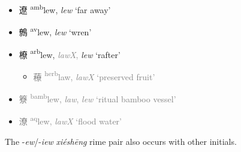 \begin{itemize}
    \item {\Large{遼}} %
    {\large{{\textsuperscript{amb}}lew}},
    \textit{lew} `far away'                  %

    \item {\Large{鷯}} %
    {\large{{\textsuperscript{av}}lew}},
    \textit{lew} `wren'                      %

    \item {\Large{橑}} %
    {\large{{\textsuperscript{arb}}lew}},
    \textcolor{gray}{\textit{lawX},}
    \textit{lew} `rafter'        %

\begin{itemize}
    \item \textcolor{gray}{{\Large{䕩}} %
    {\large{{\textsuperscript{herb}}law}},
    \textit{lawX} `preserved fruit'} %
\end{itemize}

\item \textcolor{gray}{{\Large{簝}} %
{\large{{\textsuperscript{bamb}}lew}},
\textit{law}, \textit{lew} `ritual bamboo vessel'} %

\item \textcolor{gray}{{\Large{潦}} %
{\large{{\textsuperscript{aq}}lew}},
\textit{lawX} `flood water'} %

\end{itemize}

The -\textit{ew}/-\textit{iew} \textit{xiéshēng} rime pair also occurs with other initials.  


